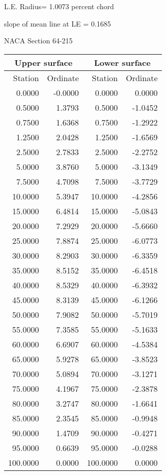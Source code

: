 \documentclass[11pt]{book}
\begin{document}
L.E. Radius=  1.0073 percent chord


 slope of mean line at LE =  0.1685
 \newpage
  \label{s64-215}
 \begin{Large}
 NACA Section 64-215
 \end{Large}
  
 \vspace{8mm}
 \begin{tabular}{|r|r|r|r|} \hline 
 \multicolumn{2}{|c|}{Upper surface} & \multicolumn{2}{|c|}{Lower surface} \\
 \hline
 Station & Ordinate & Station & Ordinate \\
 \hline
0.0000 & -0.0000 & 0.0000 & 0.0000 \\
0.5000 & 1.3793 & 0.5000 & -1.0452 \\
0.7500 & 1.6368 & 0.7500 & -1.2922 \\
1.2500 & 2.0428 & 1.2500 & -1.6569 \\
2.5000 & 2.7833 & 2.5000 & -2.2752 \\
5.0000 & 3.8760 & 5.0000 & -3.1349 \\
7.5000 & 4.7098 & 7.5000 & -3.7729 \\
10.0000 & 5.3947 & 10.0000 & -4.2856 \\
15.0000 & 6.4814 & 15.0000 & -5.0843 \\
20.0000 & 7.2929 & 20.0000 & -5.6660 \\
25.0000 & 7.8874 & 25.0000 & -6.0773 \\
30.0000 & 8.2903 & 30.0000 & -6.3359 \\
35.0000 & 8.5152 & 35.0000 & -6.4518 \\
40.0000 & 8.5329 & 40.0000 & -6.3932 \\
45.0000 & 8.3139 & 45.0000 & -6.1266 \\
50.0000 & 7.9082 & 50.0000 & -5.7019 \\
55.0000 & 7.3585 & 55.0000 & -5.1633 \\
60.0000 & 6.6907 & 60.0000 & -4.5384 \\
65.0000 & 5.9278 & 65.0000 & -3.8523 \\
70.0000 & 5.0894 & 70.0000 & -3.1271 \\
75.0000 & 4.1967 & 75.0000 & -2.3878 \\
80.0000 & 3.2747 & 80.0000 & -1.6641 \\
85.0000 & 2.3545 & 85.0000 & -0.9948 \\
90.0000 & 1.4709 & 90.0000 & -0.4271 \\
95.0000 & 0.6639 & 95.0000 & -0.0288 \\
100.0000 & 0.0000 & 100.0000 & 0.0000 \\
 \hline 
 \end{tabular}
\end{document}

